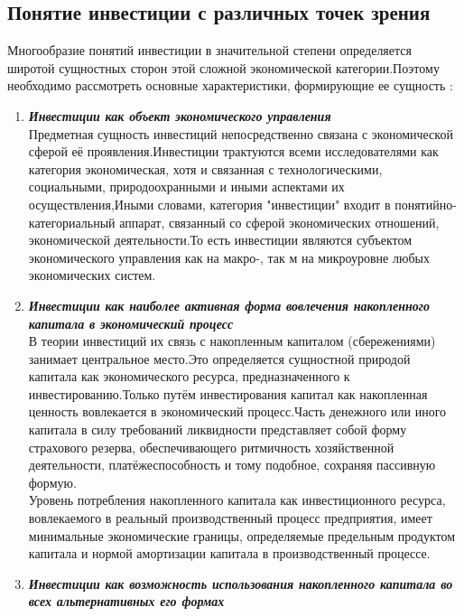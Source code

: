 \documentclass[a4paper,12pt]{article}
\begin{document}
		\subsection{Понятие инвестиции с различных точек зрения}
		Многообразие понятий инвестиции в значительной степени определяется широтой сущностных сторон этой сложной экономической категории.Поэтому необходимо рассмотреть основные характеристики, формирующие ее сущность : 
\begin{flushleft}
 			\hangindent=1.5cm  \noindent
			\begin{enumerate}
				\item \textbf{\textit{Инвестиции как объект экономического управления}}\\ \medskip
				Предметная сущность инвестиций непосредственно связана с экономической сферой её проявления.Инвестиции трактуются всеми исследователями как категория экономическая, хотя и связанная с технологическими, социальными, природоохранными и иными аспектами их осуществления,Иными словами, категория "инвестиции" входит в понятийно-категориальный аппарат, связанный со сферой экономических отношений, экономической деятельности.То есть инвестиции являются субъектом экономического управления как на макро-, так м на микроуровне любых   
экономических систем.
				\item \textbf{\textit{Инвестиции как наиболее активная  форма вовлечения накопленного капитала в экономический процесс}}\\ \medskip
			В теории инвестиций их связь с накопленным капиталом (сбережениями) занимает центральное место.Это определяется сущностной природой капитала как экономического ресурса, предназначенного к инвестированию.Только путём инвестирования капитал как накопленная ценность вовлекается в экономический процесс.Часть денежного или иного капитала в силу требований ликвидности представляет собой форму страхового резерва, обеспечивающего ритмичность хозяйственной деятельности, платёжеспособность и тому подобное, сохраняя пассивную формую.\\
			Уровень потребления накопленного капитала как инвестиционного ресурса, вовлекаемого в реальный производственный процесс предприятия, имеет минимальные экономические границы, определяемые предельным продуктом капитала и нормой	амортизации капитала в производственный процессе.
				\item \textbf{\textit{Инвестиции как возможность использования накопленного капитала во всех альтернативных его формах}}\\ \medskip

\end{enumerate}
\end{flushleft}
\end{document}
